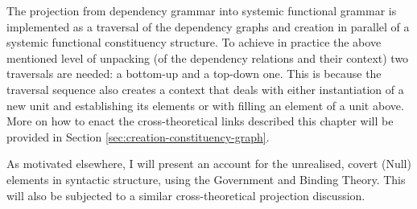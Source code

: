    The projection from dependency grammar into systemic functional grammar is implemented as a traversal of the dependency graphs and creation in parallel of a systemic functional constituency structure. To achieve in practice the above mentioned level of unpacking (of the dependency relations and their context) two traversals are needed: a bottom-up and a top-down one. This is because the traversal sequence also creates a context that deals with either instantiation of a new unit and establishing its elements or with filling an element of a unit above. More on how to enact the cross-theoretical links described this chapter will be provided in Section \ref{sec:creation-constituency-graph}.


    As motivated elsewhere, I will present an account for the unrealised, covert (Null) elements in syntactic structure, using the Government and Binding Theory. This will also be subjected to a similar cross-theoretical projection discussion.

%
%
%

